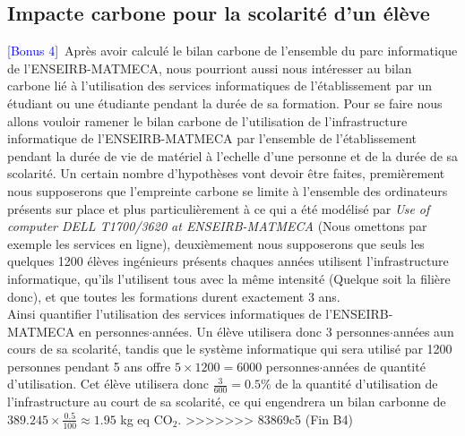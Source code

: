 \documentclass[12pt,a4paper]{paper}
\begin{document}
\subsection{Impacte carbone pour la scolarité d'un élève}
\textcolor{blue}{[Bonus 4]}~Après avoir calculé le bilan carbone de l'ensemble du parc informatique de l'ENSEIRB-MATMECA, nous pourriont aussi nous intéresser au bilan carbone lié à l'utilisation des services informatiques de l'établissement par un étudiant ou une étudiante pendant la durée de sa formation. Pour se faire nous allons vouloir ramener le bilan carbone de l'utilisation de l'infrastructure informatique de l'ENSEIRB-MATMECA par l'ensemble de l'établissement pendant la durée de vie de matériel à l'echelle d'une personne et de la durée de sa scolarité. Un certain nombre d'hypothèses vont devoir être faites, premièrement nous supposerons que l'empreinte carbone se limite à l'ensemble des ordinateurs présents sur place et plus particulièrement à ce qui a été modélisé par \textit{Use of computer DELL T1700/3620 at ENSEIRB-MATMECA} (Nous omettons par exemple les services en ligne), deuxièmement nous supposerons que seuls les quelques 1200 élèves ingénieurs présents chaques années utilisent l'infrastructure informatique, qu'ils l'utilisent tous avec la même intensité (Quelque soit la filière donc), et que toutes les formations durent exactement 3 ans. \\
Ainsi quantifier l'utilisation des services informatiques de l'ENSEIRB-MATMECA en personnes$\cdot$années. Un élève utilisera donc 3 personnes$\cdot$années aun cours de sa scolarité, tandis que le système informatique qui sera utilisé par 1200 personnes pendant 5 ans offre $5\times1200=6000$ personnes$\cdot$années de quantité d'utilisation. Cet élève utilisera donc $\frac{3}{600}=0.5\%$ de la quantité d'utilisation de l'infrastructure au court de sa scolarité, ce qui engendrera un bilan carbonne de $389.245\times\frac{0.5}{100}\approx1.95$ kg eq CO$_{2}$.
>>>>>>> 83869c5 (Fin B4)
\end{document}
